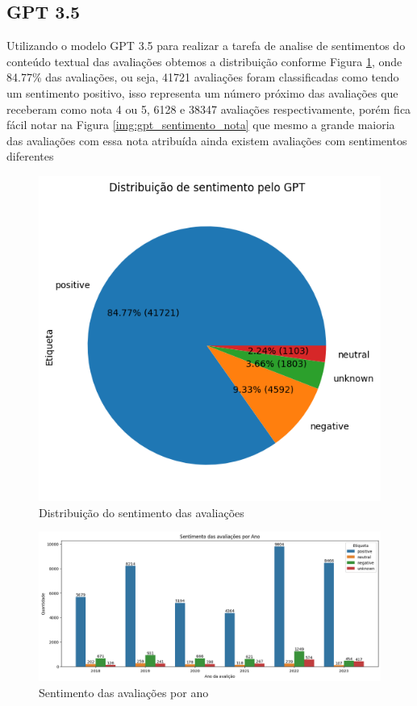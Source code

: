 \subsection{GPT 3.5}
\label{sec:resultados:subsec:gpt}

Utilizando o modelo GPT 3.5 para realizar a tarefa de analise de sentimentos do conteúdo textual das avaliações obtemos a distribuição conforme Figura \ref{img:gpt_pizza_distribuicao}, onde 84.77\% das avaliações, ou seja, 41721 avaliações foram classificadas como tendo um sentimento positivo, isso representa um número próximo das avaliações que receberam como nota 4 ou 5, 6128 e 38347 avaliações respectivamente, porém fica fácil notar na Figura \ref{img:gpt_sentimento_nota} que mesmo a grande maioria das avaliações com essa nota atribuída ainda existem avaliações com sentimentos diferentes

\begin{figure}
	\centering
	\includegraphics[width=1\textwidth]{figs/gpt/distribuicao_pizza.png}
	\caption{Distribuição do sentimento das avaliações}
	\label{img:gpt_pizza_distribuicao}
\end{figure}

\begin{figure}
	\centering
	\includegraphics[width=1\textwidth]{figs/gpt/sentimento_ano.png}
	\caption{Sentimento das avaliações por ano}
	\label{img:gpt_sentimento_ano}
\end{figure}

